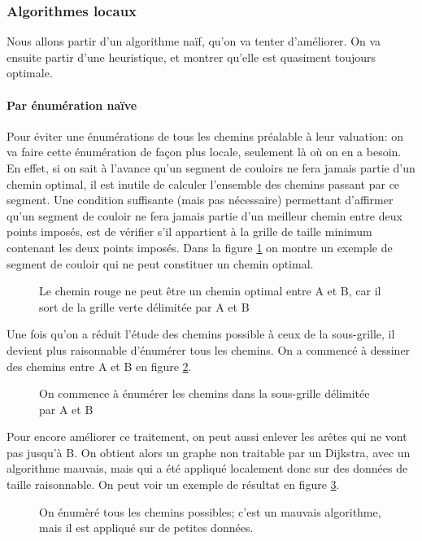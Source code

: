 \subsubsection{Algorithmes locaux}
Nous allons partir d'un algorithme naïf, qu'on va tenter d'améliorer. On va ensuite partir d'une heuristique, et montrer qu'elle est quasiment toujours optimale.
\paragraph{Par énumération naïve}Pour éviter une énumérations de tous les chemins préalable à leur valuation: on va faire cette énumération de façon plus locale, seulement là où on en a besoin. En effet, si on sait à l'avance qu'un segment de couloirs ne fera jamais partie d'un chemin optimal, il est inutile de calculer l'ensemble des chemins passant par ce segment. Une condition suffisante (mais pas nécessaire) permettant d'affirmer qu'un segment de couloir ne fera jamais partie d'un meilleur chemin entre deux points imposés, est de vérifier s'il appartient à la grille de taille minimum contenant les deux points imposés. Dans la figure \ref{fig:grille2} on montre un exemple de segment de couloir qui ne peut constituer un chemin optimal.\\
\begin{figure}[h]
	\centering
	
	\caption{Le chemin rouge ne peut être un chemin optimal entre A et B, car il sort de la grille verte délimitée par A et B}
	\label{fig:grille2}
\end{figure}
Une fois qu'on a réduit l'étude des chemins possible à ceux de la sous-grille, il devient plus raisonnable d'énumérer tous les chemins. On a commencé à dessiner des chemins entre A et B en figure \ref{fig:grille3}.\\
\begin{figure}[h]
	\centering
	
	\caption{On commence à énumérer les chemins dans la sous-grille délimitée par A et B}
	\label{fig:grille3}
\end{figure}

Pour encore améliorer ce traitement, on peut aussi enlever les arêtes qui ne vont pas jusqu'à B. On obtient alors un graphe non traitable par un Dijkstra, avec un algorithme mauvais, mais qui a été appliqué localement donc sur des données de taille raisonnable. On peut voir un exemple de résultat en figure \ref{fig:grille4}.\\
\begin{figure}
	\centering
	
	\caption{On énumèré tous les chemins possibles; c'est un mauvais algorithme, mais il est appliqué sur de petites données.}
	\label{fig:grille4}
\end{figure}
